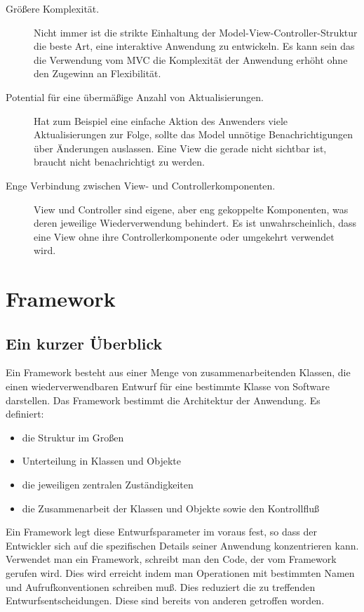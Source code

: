 \documentclass[11pt,a4paper,titlepage]{scrreprt}
\begin{document}
\begin{description}
\item[Größere Komplexität.]
Nicht immer ist die strikte Einhaltung der Model-View-Controller-Struktur die beste Art, eine
interaktive Anwendung zu entwickeln. Es kann sein das die Verwendung vom MVC die Komplexität
der Anwendung erhöht ohne den Zugewinn an Flexibilität.

\item[Potential für eine übermäßige Anzahl von Aktualisierungen.] Hat zum Beispiel eine
einfache Aktion des Anwenders viele Aktualisierungen zur Folge, sollte das Model unnötige
Benachrichtigungen über Änderungen auslassen. Eine View die gerade nicht sichtbar ist, braucht
nicht benachrichtigt zu werden.

\item[Enge Verbindung zwischen View- und Controllerkomponenten.] View und Controller sind
eigene, aber eng gekoppelte Komponenten, was deren jeweilige Wiederverwendung behindert.
Es ist unwahrscheinlich, dass eine View ohne ihre Controllerkomponente oder umgekehrt
verwendet wird.
\end{description}

\chapter{Framework}
\section{Ein kurzer Überblick}
Ein Framework besteht aus einer Menge von zusammenarbeitenden Klassen, die einen
wiederverwendbaren Entwurf für eine bestimmte Klasse von Software darstellen. Das
Framework bestimmt die Architektur der Anwendung. Es definiert:

\begin{itemize}
\item die Struktur im Großen
\item Unterteilung in Klassen und Objekte
\item die jeweiligen zentralen Zuständigkeiten
\item die Zusammenarbeit der Klassen und Objekte sowie den Kontrollfluß
\end{itemize}

Ein Framework legt diese Entwurfsparameter im voraus fest, so dass der Entwickler
sich auf die spezifischen Details seiner Anwendung konzentrieren kann.
Verwendet man ein Framework, schreibt man den Code, der vom Framework gerufen wird.
Dies wird erreicht indem man Operationen mit bestimmten Namen und Aufrufkonventionen
schreiben muß. Dies reduziert die zu treffenden Entwurfsentscheidungen. Diese sind
bereits von anderen getroffen worden.
\end{document}
